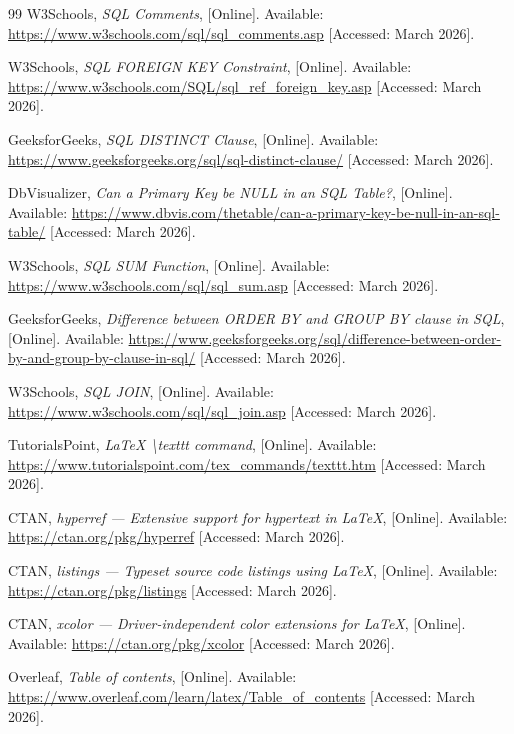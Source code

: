 \documentclass[12pt, a4paper]{report}
\begin{document}
\begin{thebibliography}{99}
W3Schools, \textit{SQL Comments}, [Online]. Available: \url{https://www.w3schools.com/sql/sql_comments.asp} [Accessed: March 2026].

W3Schools, \textit{SQL FOREIGN KEY Constraint}, [Online]. Available: \url{https://www.w3schools.com/SQL/sql_ref_foreign_key.asp} [Accessed: March 2026].

GeeksforGeeks, \textit{SQL DISTINCT Clause}, [Online]. Available: \url{https://www.geeksforgeeks.org/sql/sql-distinct-clause/} [Accessed: March 2026].

DbVisualizer, \textit{Can a Primary Key be NULL in an SQL Table?}, [Online]. Available: \url{https://www.dbvis.com/thetable/can-a-primary-key-be-null-in-an-sql-table/} [Accessed: March 2026].

W3Schools, \textit{SQL SUM Function}, [Online]. Available: \url{https://www.w3schools.com/sql/sql_sum.asp} [Accessed: March 2026].

GeeksforGeeks, \textit{Difference between ORDER BY and GROUP BY clause in SQL}, [Online]. Available: \url{https://www.geeksforgeeks.org/sql/difference-between-order-by-and-group-by-clause-in-sql/} [Accessed: March 2026].

W3Schools, \textit{SQL JOIN}, [Online]. Available: \url{https://www.w3schools.com/sql/sql_join.asp} [Accessed: March 2026].


TutorialsPoint, \textit{LaTeX \textbackslash texttt command}, [Online]. Available: \url{https://www.tutorialspoint.com/tex_commands/texttt.htm} [Accessed: March 2026].

CTAN, \textit{hyperref --- Extensive support for hypertext in LaTeX}, [Online]. Available: \url{https://ctan.org/pkg/hyperref} [Accessed: March 2026].

CTAN, \textit{listings --- Typeset source code listings using LaTeX}, [Online]. Available: \url{https://ctan.org/pkg/listings} [Accessed: March 2026].

CTAN, \textit{xcolor --- Driver-independent color extensions for LaTeX}, [Online]. Available: \url{https://ctan.org/pkg/xcolor} [Accessed: March 2026].

Overleaf, \textit{Table of contents}, [Online]. Available: \url{https://www.overleaf.com/learn/latex/Table_of_contents} [Accessed: March 2026].


\end{thebibliography}
\end{document}
